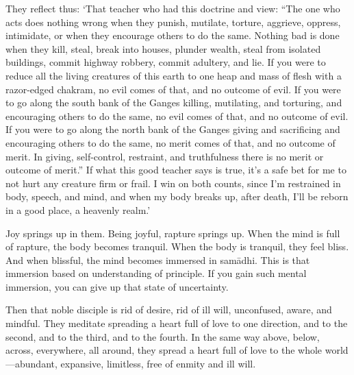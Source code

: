 \documentclass[12pt,openany]{book}%
\begin{document}
They reflect thus: ‘That teacher who had this doctrine and view: “The one who acts does nothing wrong when they punish, mutilate, torture, aggrieve, oppress, intimidate, or when they encourage others to do the same. Nothing bad is done when they kill, steal, break into houses, plunder wealth, steal from isolated buildings, commit highway robbery, commit adultery, and lie. If you were to reduce all the living creatures of this earth to one heap and mass of flesh with a razor-edged chakram, no evil comes of that, and no outcome of evil. If you were to go along the south bank of the Ganges killing, mutilating, and torturing, and encouraging others to do the same, no evil comes of that, and no outcome of evil. If you were to go along the north bank of the Ganges giving and sacrificing and encouraging others to do the same, no merit comes of that, and no outcome of merit. In giving, self-control, restraint, and truthfulness there is no merit or outcome of merit.” If what this good teacher says is true, it’s a safe bet for me to not hurt any creature firm or frail. I win on both counts, since I’m restrained in body, speech, and mind, and when my body breaks up, after death, I’ll be reborn in a good place, a heavenly realm.’ 

Joy springs up in them. Being joyful, rapture springs up. When the mind is full of rapture, the body becomes tranquil. When the body is tranquil, they feel bliss. And when blissful, the mind becomes immersed in \textsanskrit{samādhi}. This is that immersion based on understanding of principle. If you gain such mental immersion, you can give up that state of uncertainty. 

Then that noble disciple is rid of desire, rid of ill will, unconfused, aware, and mindful. They meditate spreading a heart full of love to one direction, and to the second, and to the third, and to the fourth. In the same way above, below, across, everywhere, all around, they spread a heart full of love to the whole world—abundant, expansive, limitless, free of enmity and ill will. 
\end{document}
